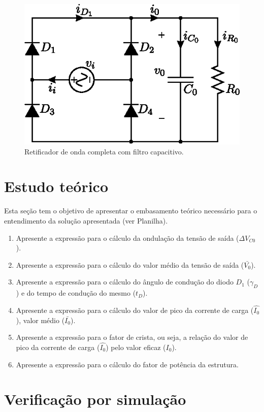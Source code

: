 \begin{figure}[!hb]
	\centering
	\includegraphics[width=0.65\linewidth]{Figs/RetOndaCompletaRC}
	\caption{Retificador de onda completa com filtro capacitivo.}
	\label{fig:retondacompletarc}
\end{figure}






\section{Estudo teórico}

Esta seção tem o objetivo de apresentar o embasamento teórico necessário para o entendimento da solução apresentada (ver Planilha).
\begin{enumerate}									
	\item  Apresente a expressão para o cálculo da ondulação da tensão de saída ($\Delta V_{C0}$).
	\item Apresente a expressão para o cálculo do valor médio da tensão de saída ($\bar{V_0}$).
	\item  Apresente a expressão para o cálculo do ângulo de condução do diodo $D_1$ ($\gamma_D$) e do tempo de condução do mesmo ($t_D$).
	\item  Apresente a expressão para o cálculo do valor de pico da corrente de carga ($\hat{I_0}$), valor médio ($\bar{I_0}$).
	\item Apresente a expressão para o fator de crista, ou seja, a relação do valor de pico da corrente de carga ($\hat{I_0}$) pelo valor eficaz (${I_0}$).
	
	\item Apresente a expressão para o cálculo do fator de potência da estrutura.
	
\end{enumerate}


\section{Verificação por simulação}


